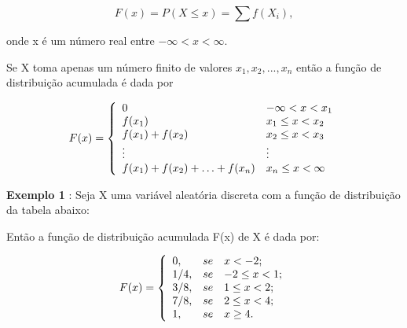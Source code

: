 \documentclass[a4paper,12pt]{report}
\begin{document}
{\begin{equation}\label{}
    F(x)=P(X \leq x)= \sum f(X_{i}),
\end{equation}

onde x é um número real entre $-\infty < x < \infty$.\vskip0.3cm


Se X toma apenas um número finito de valores
$x_{1},x_{2},...,x_{n}$ então a função de distribuição acumulada é
dada por

$$
F(x)=
\left\{%
\begin{array}{ll}
    0                                     & \hbox{$-\infty< x < x_{1}$} \\
    f(x_{1})                              & \hbox{$x_{1} \leq x < x_{2}$} \\
    f(x_{1})+f(x_{2})                     & \hbox{$x_{2} \leq x < x_{3}$} \\
    \vdots                                & \hbox{$\vdots$} \\
    f(x_{1})+f(x_{2})+\ldots+  f(x_{n})   & \hbox{$x_{n} \leq x < \infty$} \\
\end{array}%
\right.
$$


\textbf{Exemplo 1} : Seja X uma variável aleatória discreta com a
função de distribuição da tabela abaixo:


\begin{table}[!htb]
\end{table}


Então a função de distribuição acumulada F(x) de X é dada por:

$$
F(x)=
\left\{%
\begin{array}{ll}
   0   , & se \quad \hbox{$x < -2$;} \\
   1/4 , & se \quad \hbox{$-2 \leq x < 1$;} \\
   3/8 , & se \quad \hbox{$1 \leq x < 2$;} \\
   7/8 , & se \quad \hbox{$2 \leq x < 4$;} \\
   1   , & se \quad \hbox{$x \geq 4$.} \\
\end{array}%
\right.
$$

}
\end{document}
